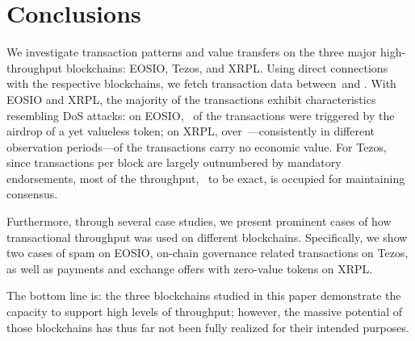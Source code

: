 \section{Conclusions}
\label{sec:conclusion}

We investigate transaction patterns and value transfers on the three major high-throughput blockchains: EOSIO, Tezos, and XRPL. 
Using direct connections with the respective blockchains, we fetch transaction data between~\startdate and \finishdate.
With EOSIO and XRPL, the majority of the transactions exhibit characteristics resembling DoS attacks: on EOSIO,~ of the transactions were triggered by the airdrop of a yet valueless token; on XRPL, over~---consistently in different observation periods---of the transactions carry no economic value. 
For Tezos, since transactions per block are largely outnumbered by mandatory endorsements, most of the throughput,~ to be exact, is occupied for maintaining consensus.

Furthermore, through several case studies, we present prominent cases of how transactional throughput was used on different blockchains.
Specifically, we show two cases of spam on EOSIO, on-chain governance related transactions on Tezos, as well as payments and exchange offers with zero-value tokens on XRPL.

The bottom line is: the three blockchains studied in this paper demonstrate the capacity to support high levels of throughput; however, the massive potential of those blockchains has thus far not been fully realized for their intended purposes.



